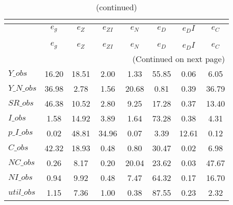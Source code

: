  
\begin{center}
\begin{longtable}{lccccccc} 
\caption{VARIANCE DECOMPOSITION (in percent)}\\
 \label{Table:th_var_decomp_uncond}\\
\toprule 
$           $	 & 	 $       {e_g}$	 & 	 $       {e_Z}$	 & 	 $    {e_{ZI}}$	 & 	 $       {e_N}$	 & 	 $       {e_D}$	 & 	 $      {e_DI}$	 & 	 $       {e_C}$\\
\midrule \endfirsthead 
\caption{(continued)}\\
 \toprule \\ 
$           $	 & 	 $       {e_g}$	 & 	 $       {e_Z}$	 & 	 $    {e_{ZI}}$	 & 	 $       {e_N}$	 & 	 $       {e_D}$	 & 	 $      {e_DI}$	 & 	 $       {e_C}$\\
\midrule \endhead 
\midrule \multicolumn{8}{r}{(Continued on next page)} \\ \bottomrule \endfoot 
\bottomrule \endlastfoot 
$Y\_obs     $	 & 	       16.20	 & 	       18.51	 & 	        2.00	 & 	        1.33	 & 	       55.85	 & 	        0.06	 & 	        6.05 \\ 
$Y\_N\_obs  $	 & 	       36.98	 & 	        2.78	 & 	        1.56	 & 	       20.68	 & 	        0.81	 & 	        0.39	 & 	       36.79 \\ 
$SR\_obs    $	 & 	       46.38	 & 	       10.52	 & 	        2.80	 & 	        9.25	 & 	       17.28	 & 	        0.37	 & 	       13.40 \\ 
$I\_obs     $	 & 	        1.58	 & 	       14.92	 & 	        3.89	 & 	        1.64	 & 	       73.28	 & 	        0.38	 & 	        4.31 \\ 
$p\_I\_obs  $	 & 	        0.02	 & 	       48.81	 & 	       34.96	 & 	        0.07	 & 	        3.39	 & 	       12.61	 & 	        0.12 \\ 
$C\_obs     $	 & 	       42.32	 & 	       18.93	 & 	        0.48	 & 	        0.80	 & 	       30.47	 & 	        0.02	 & 	        6.98 \\ 
$NC\_obs    $	 & 	        0.26	 & 	        8.17	 & 	        0.20	 & 	       20.04	 & 	       23.62	 & 	        0.03	 & 	       47.67 \\ 
$NI\_obs    $	 & 	        0.94	 & 	        9.92	 & 	        0.48	 & 	        7.47	 & 	       64.32	 & 	        0.17	 & 	       16.70 \\ 
$util\_obs  $	 & 	        1.15	 & 	        7.36	 & 	        1.00	 & 	        0.38	 & 	       87.55	 & 	        0.23	 & 	        2.32 \\ 

\end{longtable}
\end{center}
